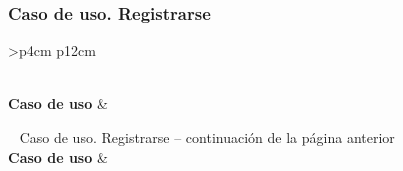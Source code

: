 \subsubsection{Caso de uso. Registrarse} \label{sec:cu_registro}
\begin{longtable}{
    >{}p{4cm}
    p{12cm}
    }
    \caption{Caso de uso. Registrarse} \label{table:cu_registro} \\
    \toprule
    \textbf{Caso de uso} &  \\
    \endfirsthead
    
    {{ \tablename\ \thetable{} Caso de uso. Registrarse -- continuación de la página anterior}} \\
    \toprule
    \textbf{Caso de uso} &  \\
    \midrule
    \endhead
    
    \midrule
     \\ 
    \endfoot
    
    \bottomrule
    \endlastfoot
    

\end{longtable}
